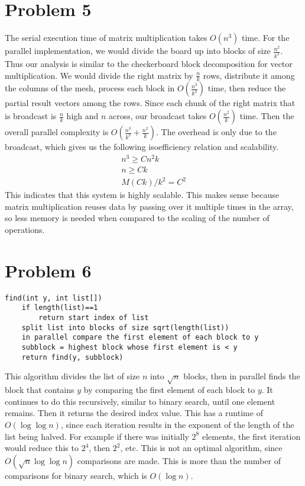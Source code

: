 \documentclass[12pt]{article}
\begin{document}
\section*{Problem 5}

The serial execution time of matrix multiplication takes \(O(n^3)\) time.
For the parallel implementation, we would divide the board up into blocks of size \(\frac{n^2}{k^2}\). Thus our analysis is similar to
the checkerboard block decomposition for vector multiplication. We would divide the right matrix by \(\frac{n}{k}\) rows,
distribute it among the columns of the mesh, process each block in \(O(\frac{n^3}{k^2})\) time, then reduce the partial result vectors
among the rows. Since each chunk of the right matrix that is broadcast is \(\frac{n}{k}\) high and \(n\) across, our broadcast takes
\(O(\frac{n^2}{k})\) time. Then the overall parallel complexity is \(O(\frac{n^3}{k^2} + \frac{n^2}{k})\).
The overhead is only due to the broadcast, which gives us the following isoefficiency relation and scalability.
\begin{align*}
    n^3\geq Cn^2k\\
    n\geq Ck\\
    M(Ck)/k^2 = C^2
\end{align*}
This indicates that this system is highly scalable. This makes sense because matrix multiplication reuses data by passing over it multiple
times in the array, so less memory is needed when compared to the scaling of the number of operations.

\section*{Problem 6}

\begin{verbatim}
find(int y, int list[])
    if length(list)==1
        return start index of list
    split list into blocks of size sqrt(length(list))
    in parallel compare the first element of each block to y
    subblock = highest block whose first element is < y
    return find(y, subblock)
\end{verbatim}
This algorithm divides the list of size \(n\) into \(\sqrt{n}\) blocks, then in parallel finds the block that contains \(y\) by comparing
the first element of each block to \(y\). It continues to do this recursively, similar to binary search, until one element remains.
Then it returns the desired index value. This has a runtime of \(O(\log \log n)\), since each iteration results in the exponent
of the length of the list being halved. For example if there was initially \(2^8\) elements, the first iteration would reduce this
to \(2^4\), then \(2^2\), etc. This is not an optimal algorithm, since \(O(\sqrt{n} \log \log n)\) comparisons are made. This
is more than the number of comparisons for binary search, which is \(O(\log n)\).
\end{document}
